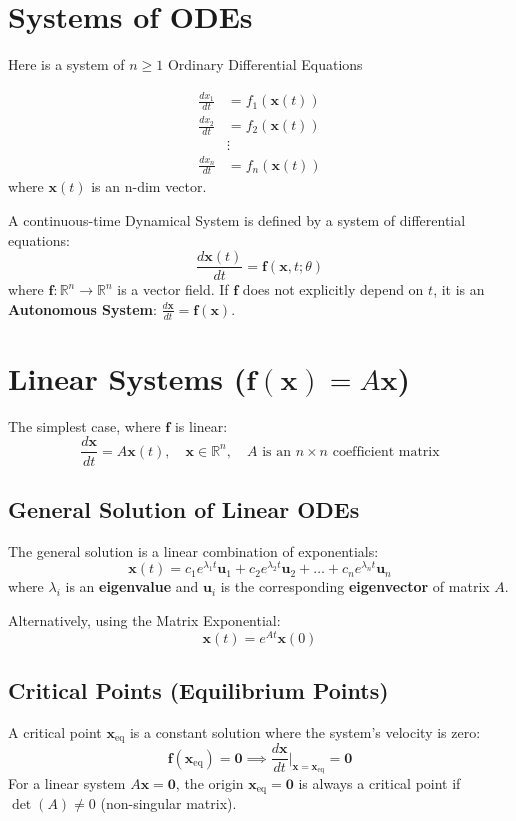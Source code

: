 \documentclass{report}
\begin{document}
\section*{Systems of ODEs}
Here is a system of $n\ge1$ Ordinary Differential Equations

\begin{align*}
\frac{dx_{1}}{dt}&=f_{1}(\mathbf{x}(t))\\
\frac{dx_{2}}{dt}&=f_{2}(\mathbf{x}(t))\\
&\vdots \\
\frac{dx_{n}}{dt}&=f_{n}(\mathbf{x}(t))
\end{align*}
where $\mathbf{x}(t)$ is an n-dim vector.

A continuous-time Dynamical System is defined by a system of differential equations:
\[
\frac{d\mathbf{x}(t)}{dt} = \mathbf{f}(\mathbf{x}, t; \theta)
\]
where $\mathbf{f}: \mathbb{R}^{n} \rightarrow \mathbb{R}^{n}$ is a vector field. If $\mathbf{f}$ does not explicitly depend on $t$, it is an \textbf{Autonomous System}: $\frac{d\mathbf{x}}{dt} = \mathbf{f}(\mathbf{x})$.

\section*{Linear Systems ($\mathbf{f}(\mathbf{x}) = A\mathbf{x}$)}
The simplest case, where $\mathbf{f}$ is linear:
\[
\frac{d\mathbf{x}}{dt} = A\mathbf{x}(t), \quad \mathbf{x} \in \mathbb{R}^{n}, \quad A \text{ is an } n \times n \text{ coefficient matrix}
\]

\subsection*{General Solution of Linear ODEs}
The general solution is a linear combination of exponentials:
\[
\mathbf{x}(t) = c_1 e^{\lambda_1 t} \mathbf{u}_1 + c_2 e^{\lambda_2 t} \mathbf{u}_2 + \dots + c_n e^{\lambda_n t} \mathbf{u}_n
\]
where $\lambda_i$ is an \textbf{eigenvalue} and $\mathbf{u}_i$ is the corresponding \textbf{eigenvector} of matrix $A$.

Alternatively, using the Matrix Exponential:
\[
\mathbf{x}(t) = e^{At}\mathbf{x}(0)
\]

\subsection*{Critical Points (Equilibrium Points)}
A critical point $\mathbf{x}_{\text{eq}}$ is a constant solution where the system's velocity is zero:
\[
\mathbf{f}(\mathbf{x}_{\text{eq}}) = \mathbf{0} \implies \frac{d\mathbf{x}}{dt} \Big|_{\mathbf{x} = \mathbf{x}_{\text{eq}}} = \mathbf{0}
\]
For a linear system $A\mathbf{x}=\mathbf{0}$, the origin $\mathbf{x}_{\text{eq}}=\mathbf{0}$ is always a critical point if $\det(A) \ne 0$ (non-singular matrix).
\end{document}
